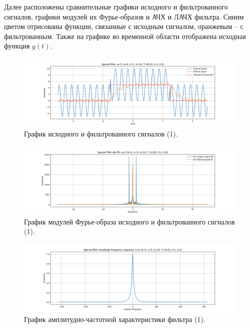 \documentclass[a4paper, 12pt]{article}
\begin{document}
    Далее расположены сравнительные графики исходного и фильтрованного сигналов, графики модулей их Фурье-образов и АЧХ и ЛАЧХ фильтра.
    Синим цветом отрисованы функции, связанные с исходным сигналом, оранжевым -- с фильтрованным. Также на графике во временной области
    отображена исходная функция $g(t)$.
    \begin{figure}[H]
        \centering
        \includegraphics[scale=0.4]{1_fl2.png}
        \captionsetup{skip=0pt}
        \caption{График исходного и фильтрованного сигналов (1).}
        \label{fig:filin21}
    \end{figure}
    \begin{figure}[H]
        \centering
        \includegraphics[scale=0.4]{1_fl2_abs.png}
        \captionsetup{skip=0pt}
        \caption{График модулей Фурье-образа исходного и фильтрованного сигналов (1).}
        \label{fig:filinabs21}
    \end{figure}
    \begin{figure}[H]
        \centering
        \includegraphics[scale=0.4]{1_fl2_afr.png}
        \captionsetup{skip=0pt}
        \caption{График амплитудно-частотной характеристики фильтра (1).}
        \label{fig:filinafr21}
    \end{figure}
\end{document}
